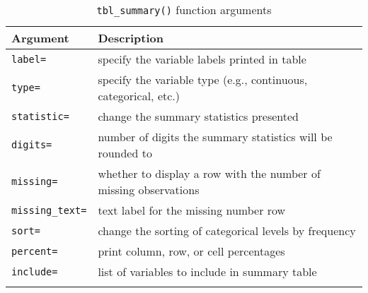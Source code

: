\captionsetup[table]{labelformat=empty,skip=1pt}
\begin{longtable}{ll}
\toprule
Argument & Description \\ 
\midrule
\texttt{label=} & specify the variable labels printed in table \\ 
\texttt{type=} & specify the variable type (e.g., continuous, categorical, etc.) \\ 
\texttt{statistic=} & change the summary statistics presented \\ 
\texttt{digits=} & number of digits the summary statistics will be rounded to \\ 
\texttt{missing=} & whether to display a row with the number of missing observations \\ 
\texttt{missing\_text=} & text label for the missing number row \\ 
\texttt{sort=} & change the sorting of categorical levels by frequency \\ 
\texttt{percent=} & print column, row, or cell percentages \\ 
\texttt{include=} & list of variables to include in summary table \\ 
\caption{\label{tab:}\texttt{tbl\_summary()} function arguments}\\
\bottomrule
\end{longtable}

